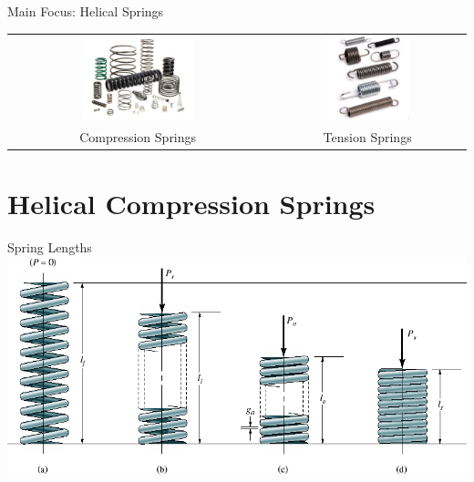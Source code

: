 \documentclass[10pt, svgnames]{beamer}
\begin{document}
\begin{frame}[label={sec:org01e65cd}]{Main Focus: Helical Springs}
\centering
\begin{tabular}{cc}
  \includegraphics[width=0.45\textwidth]{pictures/compression-springs} &
  \includegraphics[width=0.45\textwidth]{pictures/tension-springs} \\
  Compression Springs & Tension Springs
\end{tabular}
\end{frame}

\section{Helical Compression Springs}
\label{sec:org2b510c1}

\begin{frame}[label={sec:orge20db30}]{Spring Lengths}
\centering
\includegraphics[width=\textwidth]{pictures/spring-lengths}
\end{frame}
\end{document}
